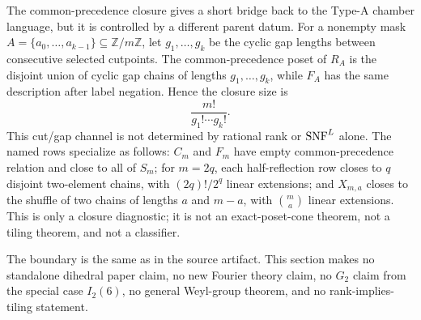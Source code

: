 The common-precedence closure gives a short bridge back to the Type-A chamber language, but it is controlled by a different parent datum.  For a nonempty mask
\(A=\{a_0,\ldots,a_{k-1}\}\subseteq\mathbb Z/m\mathbb Z\), let
\(g_1,\ldots,g_k\) be the cyclic gap lengths between consecutive selected cutpoints.  The common-precedence poset of \(R_A\) is the disjoint union of cyclic gap chains of lengths \(g_1,\ldots,g_k\), while \(F_A\) has the same description after label negation.  Hence the closure size is
\[
  \frac{m!}{g_1!\cdots g_k!}.
\]
This cut/gap channel is not determined by rational rank or \(\operatorname{SNF}^{L}\) alone.  The named rows specialize as follows: \(C_m\) and \(F_m\) have empty common-precedence relation and close to all of \(S_m\); for \(m=2q\), each half-reflection row closes to \(q\) disjoint two-element chains, with \((2q)!/2^q\) linear extensions; and \(X_{m,a}\) closes to the shuffle of two chains of lengths \(a\) and \(m-a\), with \(\binom{m}{a}\) linear extensions.  This is only a closure diagnostic; it is not an exact-poset-cone theorem, not a tiling theorem, and not a classifier.

The boundary is the same as in the source artifact.  This section makes no standalone dihedral paper claim, no new Fourier theory claim, no \(G_2\) claim from the special case \(I_2(6)\), no general Weyl-group theorem, and no rank-implies-tiling statement.